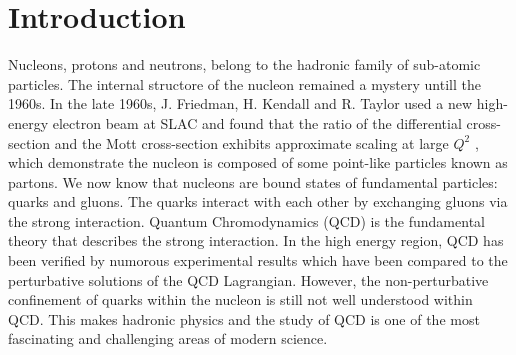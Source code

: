 

\chapter{Introduction}
\label{C1}

Nucleons, protons and neutrons, belong to the hadronic family of sub-atomic particles. The internal structore of the nucleon remained a mystery untill the 1960s. In the late 1960s, J. Friedman, H. Kendall and R. Taylor used a new high-energy electron beam at SLAC and found that the ratio of the differential cross-section and the Mott cross-section exhibits approximate scaling at large $Q^2$ \cite{Breidenbach1969}, which demonstrate the nucleon is composed of some point-like particles known as partons. We now know that nucleons are bound states of fundamental particles: quarks and gluons. The quarks interact with each other by exchanging gluons via the strong interaction. Quantum Chromodynamics (QCD) is the fundamental theory that describes the strong interaction. In the high energy region, QCD has been verified by numorous experimental results which have been compared to the perturbative solutions of the QCD Lagrangian. However, the non-perturbative confinement of quarks within the nucleon is still not well understood within QCD. This makes hadronic physics and the study of QCD is one of the most fascinating and challenging areas of modern science.

